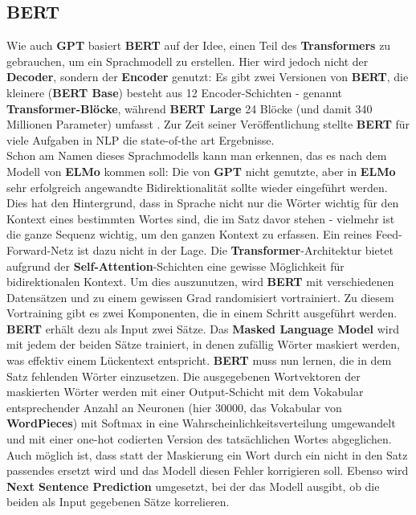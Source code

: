 \subsection{BERT}
Wie auch \textbf{GPT} basiert \textbf{BERT} auf der Idee, einen Teil des \textbf{Transformers} zu gebrauchen, um ein Sprachmodell zu erstellen. Hier wird jedoch nicht der \textbf{Decoder}, sondern der \textbf{Encoder} genutzt: Es gibt zwei Versionen von \textbf{BERT}, die kleinere (\textbf{BERT Base}) besteht aus 12 Encoder-Schichten - genannt \textbf{Transformer-Bl\"ocke}, w\"ahrend \textbf{BERT Large} 24 Bl\"ocke (und damit 340 Millionen Parameter) umfasst \cite{bert}. Zur Zeit seiner Ver\"offentlichung stellte \textbf{BERT} f\"ur viele Aufgaben in NLP die state-of-the art Ergebnisse.\\
Schon am Namen dieses Sprachmodells kann man erkennen, das es nach dem Modell von \textbf{ELMo} kommen soll: Die von \textbf{GPT} nicht genutzte, aber in \textbf{ELMo} sehr erfolgreich angewandte Bidirektionalit\"at sollte wieder eingef\"uhrt werden. Dies hat den Hintergrund, dass in Sprache nicht nur die W\"orter wichtig f\"ur den Kontext eines bestimmten Wortes sind, die im Satz davor stehen - vielmehr ist die ganze Sequenz wichtig, um den ganzen Kontext zu erfassen. Ein reines Feed-Forward-Netz ist dazu nicht in der Lage. Die \textbf{Transformer}-Architektur bietet aufgrund der \textbf{Self-Attention}-Schichten eine gewisse M\"oglichkeit f\"ur bidirektionalen Kontext. Um dies auszunutzen, wird \textbf{BERT} mit verschiedenen Datens\"atzen und zu einem gewissen Grad randomisiert vortrainiert. Zu diesem Vortraining gibt es zwei Komponenten, die in einem Schritt ausgef\"uhrt werden. \textbf{BERT} erh\"alt dezu als Input zwei S\"atze. Das \textbf{Masked Language Model} wird mit jedem der beiden S\"atze trainiert, in denen zuf\"allig W\"orter maskiert werden, was effektiv einem L\"uckentext entspricht. \textbf{BERT} muss nun lernen, die in dem Satz fehlenden W\"orter einzusetzen. Die ausgegebenen Wortvektoren der maskierten W\"orter werden mit einer Output-Schicht mit dem Vokabular entsprechender Anzahl an Neuronen (hier 30000, das Vokabular von \textbf{WordPieces}) mit Softmax in eine Wahrscheinlichkeitsverteilung umgewandelt und mit einer one-hot codierten Version des tats\"achlichen Wortes abgeglichen. Auch m\"oglich ist, dass statt der Maskierung ein Wort durch ein nicht in den Satz passendes ersetzt wird und das Modell diesen Fehler korrigieren soll. Ebenso wird \textbf{Next Sentence Prediction} umgesetzt, bei der das Modell  ausgibt, ob die beiden als Input gegebenen S\"atze korrelieren.\\
